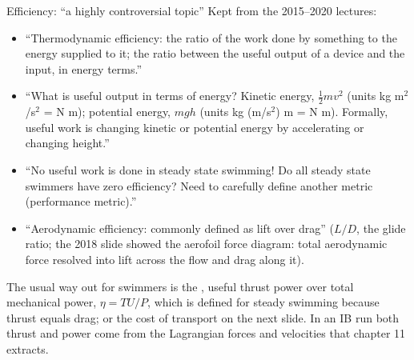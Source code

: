 \documentclass[aspectratio=169,11pt]{beamer}
\begin{document}
\begin{frame}{Efficiency: ``a highly controversial topic''}
\label{fr:eff}
\small Kept from the 2015--2020 lectures:
\begin{itemize}
  \item ``Thermodynamic efficiency: the ratio of the work done by something to the energy supplied to it; the ratio between the useful output of a device and the input, in energy terms.''
  \item ``What is useful output in terms of energy? Kinetic energy, $\tfrac12 mv^2$ (units kg m$^2$/s$^2$ = N m); potential energy, $mgh$ (units kg (m/s$^2$) m = N m). Formally, useful work is changing kinetic or potential energy by accelerating or changing height.''
  \item ``No useful work is done in steady state swimming! Do all steady state swimmers have zero efficiency? Need to carefully define another metric (performance metric).''
  \item ``Aerodynamic efficiency: commonly defined as lift over drag'' ($L/D$, the glide ratio; the 2018 slide showed the aerofoil force diagram: total aerodynamic force resolved into lift across the flow and drag along it).
\end{itemize}
\vspace{1mm}
\small The usual way out for swimmers is the , useful thrust power over total mechanical power, $\eta = TU/P$, which is defined for steady swimming because thrust equals drag; or the cost of transport on the next slide. In an IB run both thrust and power come from the Lagrangian forces and velocities that chapter 11 extracts.
\end{frame}
\end{document}
